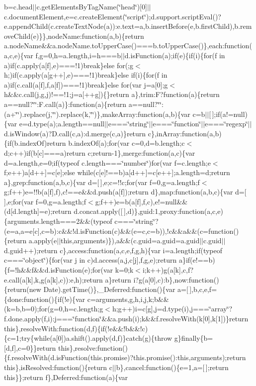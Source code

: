 b=c.\-head$|$$|$c.\-get\-Elements\-By\-Tag\-Name(\char`\"{}head\char`\"{})[0]$|$$|$c.\-document\-Element,e=c.\-create\-Element(\char`\"{}script\char`\"{});d.\-support.\-script\-Eval()?e.\-append\-Child(c.\-create\-Text\-Node(a))\-:e.\-text=a,b.\-insert\-Before(e,b.\-first\-Child),b.\-remove\-Child(e)\}\},node\-Name\-:function(a,b)\{return a.\-node\-Name\&\&a.\-node\-Name.\-to\-Upper\-Case()===b.\-to\-Upper\-Case()\},each\-:function(a,c,e)\{var f,g=0,h=a.\-length,i=h===b$|$$|$d.\-is\-Function(a);if(e)\{if(i)\{for(f in a)if(c.\-apply(a[f],e)===!1)break\}else for(;g$<$h;)if(c.\-apply(a[g++],e)===!1)break\}else if(i)\{for(f in a)if(c.\-call(a[f],f,a[f])===!1)break\}else for(var j=a[0];g$<$h\&\&c.\-call(j,g,j)!==!1;j=a[++g])\{\}return a\},trim\-:\-F?function(a)\{return a==null?\char`\"{}\char`\"{}\-:\-F.\-call(a)\}\-:function(a)\{return a==null?\char`\"{}\char`\"{}\-:(a+\char`\"{}\char`\"{}).\-replace(j,\char`\"{}\char`\"{}).\-replace(k,\char`\"{}\char`\"{})\},make\-Array\-:function(a,b)\{var c=b$|$$|$[$\,$];if(a!=null)\{var e=d.\-type(a);a.\-length==null$|$$|$e===\char`\"{}string\char`\"{}$|$$|$e===\char`\"{}function\char`\"{}$|$$|$e===\char`\"{}regexp\char`\"{}$|$$|$d.\-is\-Window(a)?\-D.\-call(c,a)\-:d.\-merge(c,a)\}return c\},in\-Array\-:function(a,b)\{if(b.\-index\-Of)return b.\-index\-Of(a);for(var c=0,d=b.\-length;c$<$d;c++)if(b[c]===a)return c;return-\/1\},merge\-:function(a,c)\{var d=a.\-length,e=0;if(typeof c.\-length===\char`\"{}number\char`\"{})for(var f=c.\-length;e$<$f;e++)a[d++]=c[e];else while(c[e]!==b)a[d++]=c[e++];a.\-length=d;return a\},grep\-:function(a,b,c)\{var d=[$\,$],e;c=!!c;for(var f=0,g=a.\-length;f$<$g;f++)e=!!b(a[f],f),c!==e\&\&d.\-push(a[f]);return d\},map\-:function(a,b,c)\{var d=[$\,$],e;for(var f=0,g=a.\-length;f$<$g;f++)e=b(a[f],f,c),e!=null\&\&(d[d.\-length]=e);return d.\-concat.\-apply([$\,$],d)\},guid\-:1,proxy\-:function(a,c,e)\{arguments.\-length===2\&\&(typeof c===\char`\"{}string\char`\"{}?(e=a,a=e[c],c=b)\-:c\&\&!d.\-is\-Function(c)\&\&(e=c,c=b)),!c\&\&a\&\&(c=function()\{return a.\-apply(e$|$$|$this,arguments)\}),a\&\&(c.\-guid=a.\-guid=a.\-guid$|$$|$c.\-guid$|$$|$d.\-guid++);return c\},access\-:function(a,c,e,f,g,h)\{var i=a.\-length;if(typeof c===\char`\"{}object\char`\"{})\{for(var j in c)d.\-access(a,j,c[j],f,g,e);return a\}if(e!==b)\{f=!h\&\&f\&\&d.\-is\-Function(e);for(var k=0;k$<$i;k++)g(a[k],c,f?e.\-call(a[k],k,g(a[k],c))\-:e,h);return a\}return i?g(a[0],c)\-:b\},now\-:function()\{return(new Date).\-get\-Time()\},\-\_\-\-Deferred\-:function()\{var a=[$\,$],b,c,e,f=\{done\-:function()\{if(!e)\{var c=arguments,g,h,i,j,k;b\&\&(k=b,b=0);for(g=0,h=c.\-length;g$<$h;g++)i=c[g],j=d.\-type(i),j===\char`\"{}array\char`\"{}?f.\-done.\-apply(f,i)\-:j===\char`\"{}function\char`\"{}\&\&a.\-push(i);k\&\&f.\-resolve\-With(k[0],k[1])\}return this\},resolve\-With\-:function(d,f)\{if(!e\&\&!b\&\&!c)\{c=1;try\{while(a[0])a.\-shift().\-apply(d,f)\}catch(g)\{throw g\}finally\{b=[d,f],c=0\}\}return this\},resolve\-:function()\{f.\-resolve\-With(d.\-is\-Function(this.\-promise)?this.\-promise()\-:this,arguments);return this\},is\-Resolved\-:function()\{return c$|$$|$b\},cancel\-:function()\{e=1,a=[$\,$];return this\}\};return f\},\-Deferred\-:function(a)\{var 